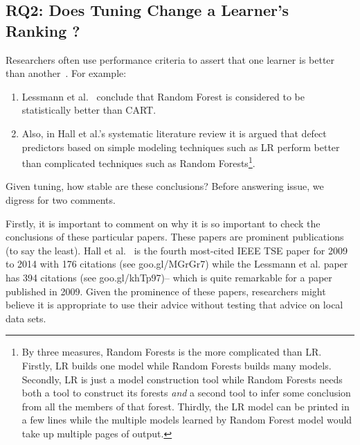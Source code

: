 \documentclass{sig-alternative}
\newcommand{\be}{\begin{enumerate}}
\newcommand{\ee}{\end{enumerate}}
\begin{document}
\subsection{RQ2:  Does Tuning Change a Learner's Ranking ?}\label{sect:rank}
Researchers often use performance criteria to assert that one learner is better than 
another~\cite{lessmann2008benchmarking,me07b,hall11}. For example:
\be
\item
Lessmann et al.~\cite{lessmann2008benchmarking} conclude that
Random Forest is considered to be statistically 
better than CART. 
\item
Also, in Hall et al.'s   systematic literature review\cite{hall11} it is argued 
that defect predictors based on simple 
modeling techniques such as LR perform better than complicated techniques such as Random Forests\footnote{By three measures,
Random Forests
is the more complicated than LR. Firstly, LR builds one model
while Random Forests builds many models. Secondly, LR is just
a model construction tool while Random Forests needs both
a tool to construct its forests {\em and} a second tool
to  infer some conclusion from all the members of that forest.
Thirdly, the LR model can be printed in a few lines while the multiple
models learned by Random
Forest model would take up multiple pages of output.}.
\ee
Given tuning, how stable are these  conclusions?
Before answering issue, we digress for two comments.



Firstly, it is important to comment on why it is  so important to check the conclusions
of these particular papers. 
These  papers are prominent publications (to say the least).
Hall et al.~\cite{hall11} is the fourth most-cited IEEE TSE
paper for 2009 to 2014 with 176 citations (see goo.gl/MGrGr7)
while the Lessmann et al. paper~\cite{lessmann2008benchmarking} has 394 citations (see
goo.gl/khTp97)-- which is quite remarkable for a paper published in 2009.
Given the prominence
of these papers, researchers might believe it is
appropriate to
  use  their advice without testing that advice on local data sets.
\end{document}
